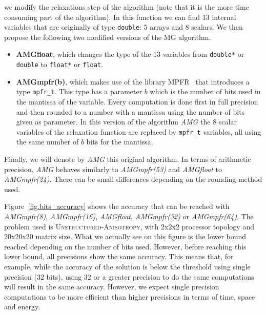  we modify the
relaxations step of the algorithm (note that it is the more time consuming
part of the algorithm). In this function we can find 13 internal variables that
are originally of type \texttt{double}: 5 arrays and 8 scalars. We then propose
the following two modified versions of the MG algorithm.

\begin{itemize}

    \item \textbf{AMGfloat}, which changes the type of the 13 variables from
        \texttt{double*} or \texttt{double} to \texttt{float*} or
        \texttt{float}.

    \item \textbf{AMGmpfr(b)}, which makes use of the library
        MPFR~\cite{MPFR,MPFR_link} that introduces a type \texttt{mpfr\_t}.
        This type has a parameter $b$ which is the number of bits used in the
        mantissa of the variable. Every computation is done first in full
        precision and then rounded to a number with a mantissa using the number
        of bits given as parameter. In this version of the algorithm \emph{AMG}
        the 8 scalar variables of the relaxation function are replaced by
        \texttt{mpfr\_t} variables, all using the same number of $b$ bits for
        the mantissa.

\end{itemize}

Finally, we will denote by \emph{AMG} this original algorithm.  In terms of
arithmetic precision, \emph{AMG} behaves similarly to \emph{AMGmpfr(53)} and
\emph{AMGfloat} to \emph{AMGmpfr(24)}. There can be small differences depending
on the rounding method used.

Figure~\ref{fig.bits_accuracy} shows the accuracy that can be reached with
\emph{AMGmpfr(8)}, \emph{AMGmpfr(16)}, \emph{AMGfloat}, \emph{AMGmpfr(32)} or
\emph{AMGmpfr(64)}. The problem used is \textsc{Unstructured-Anisotropy}, with
2x2x2 processor topology and 20x20x20 matrix size. What we actually see on this
figure is the lower bound reached depending on the number of bits used.
However, before reaching this lower bound, all precisions show the same
accuracy. This means that, for example, while the accuracy of the solution is
below the threshold using single precision (32 bits), using 32 or a greater
precision to do the same computations will result in the same accuracy.
However, we expect single precision computations to be more efficient than
higher precisions in terms of time, space and energy.

